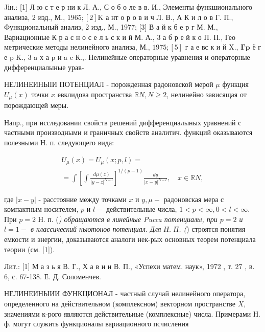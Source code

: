 \documentclass[10pt]{article}
\begin{document}
Jін.: [1] Л ю с т е р ни к Л. А., С о б о ле в в. И., Элементы функшионального анализа, 2 изд., М., $1965 ;[2] \mathrm{K}$ а нт о р о в и ч Л. В., А К и л о в Г. П., Функциональный анализ, 2 изд., М., 1977; [3] В а й к б е р г М. М., Вариационные К р а с н о с е л ь с к и й М. А., 3 а б р е й к о П. П., Гео метрические методы нелинейного анализа, М., $1975 ;[5]$ г а е вс к и й X., $\boldsymbol{\Gamma} \mathbf{p}$ ё г е p K., 3 a х а p и a c К.,. Нелинейные операторные уравнения и операторные дифференциалыные урав-



НЕЛИНЕИНЫІИ ПОТЕНЦИАЛ - порожденная радоновской мерой $\mu$ функция $U_{\mu}(x)$ точки $x$ евклидова пространства $\mathbb{R} N, N \geqslant 2$, нелинейно зависящая от порождающей меры.



Напр., при исследовании свойств решений дифференциалыных уравнений с частными производными и граничных свойств аналитич. функций оказываются полезными Н. п. следующего вида:



\[

\begin{gathered}

U_{\mu}(x)=U_{\mu}(x ; p, l)= \\

=\int\left[\int \frac{d \mu(z)}{|y-z|^{N-l}}\right]^{1 /(p-1)} \frac{d y}{|x-y|^{N-l}}, \quad x \in \mathbb{R} N,

\end{gathered}

\]



где $|x-y|$ - расстояние между точками $x$ и $y, \mu-$ радоновская мера с компактным носителем, $p$ и $l-$ действительные числа, $1<p<\infty, 0<l<\infty$. При $p=2$ Н. п. (\textit{) обращаются в линейные Pucca потенциалы, при $p=2$ и $l=1-$ в классический ньютонов потенциал. Для Н. П. (}) строятся понятия емкости и энергии, доказываются аналоги нек-рых основных теорем потенциала теории (см. [1]).



Лит.: [1] М а з ь я В. Г., Х а в и н В. П., «Успехи матем. наук», 1972 , т. 27 , в. 6, с. 67-138. Е. Д. Соломенчев.



НЕЛИНЕИНЫИИ ФУНКЦИОНАЛ - частный случай нелинейного оператора, определенного на действительном (комплексном) векторном пространстве $X$, значениями к-рого являются действительные (комплексные) числа. Примерами Н. ф. могут служить функционалы вариационного псчисления
\end{document}
